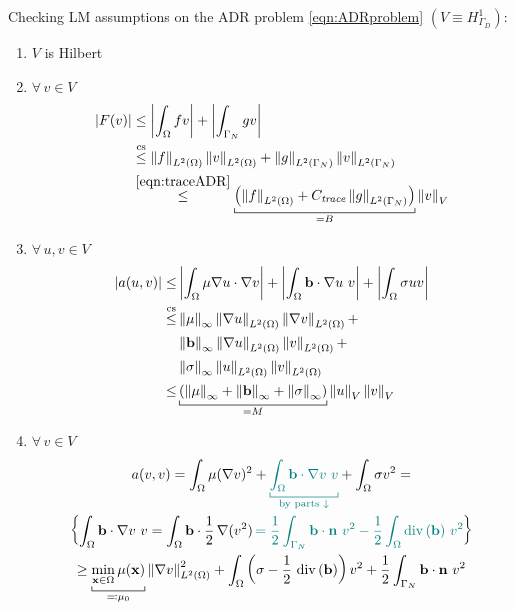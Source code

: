 Checking LM assumptions on the ADR problem \eqref{eqn:ADRproblem} $\left( V\equiv H^1_{\Gamma_D} \right)$:
\begin{enumerate}[label=\textit{(\roman*)}]
\item $V$ is Hilbert
\item $\forall\, v \in V$
\begin{align*}
\abs{F(v)}&\leq\abs{\int_\Omega fv}+\abs{\int_{\Gamma_N} gv} \\
&\overset{\text{cs}}{\leq} \norm{f}_{L^2(\Omega)} \norm{v}_{L^2(\Omega)}+\norm{g}_{L^2(\Gamma_N)} \norm{v}_{L^2(\Gamma_N)} \\
& \overset{\eqref{eqn:traceADR}}{\leq} \underbracket[0.5pt]{\left( \norm{f}_{L^2(\Omega)}+C_{\textit{trace}} \norm{g}_{L^2(\Gamma_N)}  \right)}_{=B} \norm{v}_V
\end{align*}
\item $\forall\, u,v \in V$
\begin{align*}
\abs{a(u,v)}\leq&\abs{\int_\Omega \mu \nabla u\cdot \nabla v}+ \abs{\int_\Omega \bv\cdot \nabla u\ v}+\abs{\int_\Omega \sigma u v} \\
\overset{\text{cs}}{\leq}& \norm{\mu}_\infty \norm{\nabla u}_{L^2(\Omega)} \norm{\nabla v}_{L^2(\Omega)} + \\
&\norm{\bv}_\infty \norm{\nabla u}_{L^2(\Omega)} \norm{ v}_{L^2(\Omega)}+ \\
& \norm{\sigma}_\infty \norm{ u}_{L^2(\Omega)} \norm{ v}_{L^2(\Omega)} \\
\leq& \underbracket[0.5pt]{\left( \norm{\mu}_\infty+\norm{\bv}_\infty+\norm{\sigma}_\infty \right)}_{=M} \norm{u}_V \norm{v}_V
\end{align*}

\item $\forall\, v \in V$
\begin{gather*}
a(v,v)=\int_\Omega \mu(\nabla v)^2+{\color{teal} \underbracket[0.5pt]{\int_\Omega \bv\cdot\nabla v\ v}_{\text{by parts }\downarrow}}+\int_\Omega \sigma v^2= \\
\left\{ \int_\Omega \bv\cdot\nabla v\ v= \int_\Omega\bv\cdot \frac{1}{2}\,\nabla(v^2)\,{\color{teal}=\frac{1}{2} \int_{\Gamma_N} \bv\cdot\nv\ v^2 - \frac{1}{2} \int_\Omega \Div{(\bv)}\ v^2} \right\} \\
\geq \underbracket[0.5pt]{\min_{\xv\in\Omega} \mu(\xv)}_{\eqcolon \mu_0} \norm{\nabla v}_{L^2(\Omega)}^2+\int_\Omega \left( \sigma- \frac{1}{2}\,\Div{(\bv)} \right) v^2+ \frac{1}{2}\int_{\Gamma_N} \bv\cdot\nv\ v^2 
\end{gather*}


\end{enumerate}

